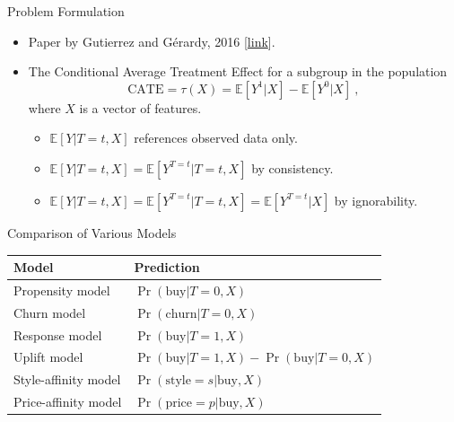 \documentclass[20pt]{beamer}
\begin{document}
\begin{frame}{Problem Formulation}
  \begin{center}
  \end{center}

\begin{itemize}
\item Paper by Gutierrez and G\'erardy, 2016 [\href{http://proceedings.mlr.press/v67/gutierrez17a/gutierrez17a.pdf}{link}].


\item The Conditional Average Treatment Effect for a subgroup in the population
  \begin{equation}
  \boxed{
    \text{CATE} = \tau(X) = \mathbb{E}[Y^1 | X] - \mathbb{E}[Y^0 | X] } \ ,
  \end{equation}
where $X$ is a vector of features.

  \begin{itemize}
    \item $\mathbb{E}[Y | T=t, X]$ references observed data only.

    \item $\mathbb{E}[Y | T=t, X] = \mathbb{E}[Y^{T=t} | T=t, X]$ by consistency.

    \item $\mathbb{E}[Y | T=t, X] = \mathbb{E}[Y^{T=t} | T=t, X] = \mathbb{E}[Y^{T=t} | X]$ by ignorability.
  \end{itemize}

\end{itemize}
\end{frame}

\begin{frame}{Comparison of Various Models}
\begin{table}
\begin{tabular}{|l|l|}
  \hline
  \textbf{Model} & \textbf{Prediction}  \\ \hline
  Propensity model & $\Pr(\text{buy} | T=0, X)$  \\ \hline
  Churn model & $\Pr(\text{churn} | T=0, X)$  \\ \hline
  Response model & $\Pr(\text{buy} | T=1, X)$  \\ \hline
  Uplift model & $\Pr(\text{buy} | T=1, X) - \Pr(\text{buy} | T=0, X)$  \\ \hline
  Style-affinity model & $\Pr(\text{style}=s | \text{buy}, X)$ \\ \hline
  Price-affinity model & $\Pr(\text{price}=p | \text{buy}, X)$ \\ \hline
\end{tabular}
\end{table}

\end{frame}
\end{document}
